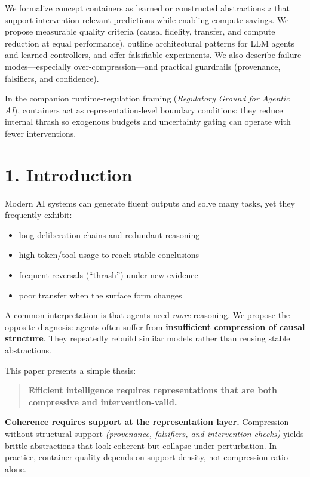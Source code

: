 \documentclass[11pt]{article}
\begin{document}
We formalize concept containers as learned or constructed abstractions \(z\) that support intervention-relevant predictions while enabling compute savings. We propose measurable quality criteria (causal fidelity, transfer, and compute reduction at equal performance), outline architectural patterns for LLM agents and learned controllers, and offer falsifiable experiments. We also describe failure modes—especially over-compression—and practical guardrails (provenance, falsifiers, and confidence).

In the companion runtime-regulation framing (\emph{Regulatory Ground for Agentic AI}), containers act as representation-level boundary conditions: they reduce internal thrash so exogenous budgets and uncertainty gating can operate with fewer interventions.

\section*{1. Introduction}
Modern AI systems can generate fluent outputs and solve many tasks, yet they frequently exhibit:

\begin{itemize}
\item long deliberation chains and redundant reasoning
\item high token/tool usage to reach stable conclusions
\item frequent reversals (“thrash”) under new evidence
\item poor transfer when the surface form changes
\end{itemize}

A common interpretation is that agents need \emph{more} reasoning. We propose the opposite diagnosis: agents often suffer from \textbf{insufficient compression of causal structure}. They repeatedly rebuild similar models rather than reusing stable abstractions.

This paper presents a simple thesis:

\begin{quote}
\textbf{Efficient intelligence requires representations that are both compressive and intervention-valid.}
\end{quote}

\noindent\textbf{Coherence requires support at the representation layer.} Compression without structural support \emph{(provenance, falsifiers, and intervention checks)} yields brittle abstractions that look coherent but collapse under perturbation. In practice, container quality depends on support density, not compression ratio alone.
\end{document}
